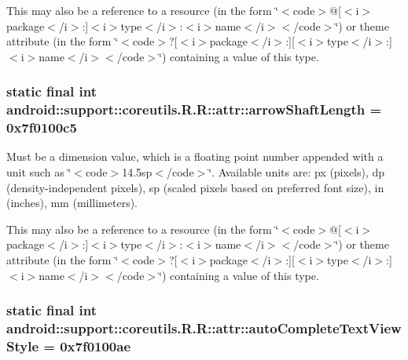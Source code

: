 This may also be a reference to a resource (in the form \char`\"{}$<$code$>$@\mbox{[}$<$i$>$package$<$/i$>$:\mbox{]}$<$i$>$type$<$/i$>$:$<$i$>$name$<$/i$>$$<$/code$>$\char`\"{}) or theme attribute (in the form \char`\"{}$<$code$>$?\mbox{[}$<$i$>$package$<$/i$>$:\mbox{]}\mbox{[}$<$i$>$type$<$/i$>$:\mbox{]}$<$i$>$name$<$/i$>$$<$/code$>$\char`\"{}) containing a value of this type. \hypertarget{classandroid_1_1support_1_1coreutils_1_1_r_1_1attr_fb0bd49018425f7a41b1b20d650c88df}{
\subsubsection[{arrowShaftLength}]{\setlength{\rightskip}{0pt plus 5cm}static final int android::support::coreutils.R.R::attr::arrowShaftLength = 0x7f0100c5}}
\label{classandroid_1_1support_1_1coreutils_1_1_r_1_1attr_fb0bd49018425f7a41b1b20d650c88df}


Must be a dimension value, which is a floating point number appended with a unit such as \char`\"{}$<$code$>$14.5sp$<$/code$>$\char`\"{}. Available units are: px (pixels), dp (density-independent pixels), sp (scaled pixels based on preferred font size), in (inches), mm (millimeters). 

This may also be a reference to a resource (in the form \char`\"{}$<$code$>$@\mbox{[}$<$i$>$package$<$/i$>$:\mbox{]}$<$i$>$type$<$/i$>$:$<$i$>$name$<$/i$>$$<$/code$>$\char`\"{}) or theme attribute (in the form \char`\"{}$<$code$>$?\mbox{[}$<$i$>$package$<$/i$>$:\mbox{]}\mbox{[}$<$i$>$type$<$/i$>$:\mbox{]}$<$i$>$name$<$/i$>$$<$/code$>$\char`\"{}) containing a value of this type. \hypertarget{classandroid_1_1support_1_1coreutils_1_1_r_1_1attr_540fda5c90441ff2b7f3f73b4c78a3b8}{
\subsubsection[{autoCompleteTextViewStyle}]{\setlength{\rightskip}{0pt plus 5cm}static final int android::support::coreutils.R.R::attr::autoCompleteTextViewStyle = 0x7f0100ae}}
\label{classandroid_1_1support_1_1coreutils_1_1_r_1_1attr_540fda5c90441ff2b7f3f73b4c78a3b8}


